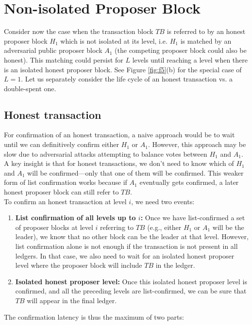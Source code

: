 \documentclass{report}
\begin{document}
\section{Non-isolated Proposer Block}
Consider now the case when the transaction block $TB$ is referred to by an honest proposer block $H_{1}$  which is not isolated at its level, i.e. $H_{1}$ is matched by an adversarial public proposer block $A_{1}$ (the competing proposer block could also be honest). This matching could persist for $L$ levels until reaching a level when there is an isolated honest proposer block. See Figure \ref{fig:f5}(b) for the special  case of $L = 1$. Let us separately consider the life cycle of an honest transaction vs. a double-spent one.
\subsection{Honest transaction}
For confirmation of an honest transaction, a naive approach would be to wait until we can definitively confirm either $H_{1}$ or $A_{1}$. However, this approach may be slow due to adversarial attacks attempting to balance votes between $H_{1}$ and $A_{1}$. A key insight is that for honest transactions, we don't need to know which of $H_{1}$ and $A_{1}$ will be confirmed—only that one of them will be confirmed. This weaker form of list confirmation works because if $A_{1}$ eventually gets confirmed, a later honest proposer block can still refer to $TB$.\\
To confirm an honest transaction at level $i$, we need two events:
\begin{enumerate}
	\item \textbf{List confirmation of all levels up to $i$:} Once we have list-confirmed a set of proposer blocks at level $i$ referring to $TB$ (e.g., either $H_{1}$ or $A_{1}$ will be the leader), we know that no other block can be the leader at that level. However, list confirmation alone is not enough if the transaction is not present in all ledgers. In that case, we also need to wait for an isolated honest proposer level where the proposer block will include $TB$ in the ledger.
	\item \textbf{Isolated honest proposer level:} Once this isolated honest proposer level is confirmed, and all the preceding levels are list-confirmed, we can be sure that $TB$ will appear in the final ledger.
\end{enumerate}
The confirmation latency is thus the maximum of two parts:\\
\end{document}
